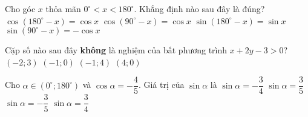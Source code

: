 \begin{ex}%
	Cho góc $x$ thỏa mãn $0^\circ < x < 180^\circ$. Khẳng định nào sau đây là đúng?
	\choice
	{$\cos \left(180^\circ - x \right) = \cos x$}
	{$\cos \left(90^\circ - x \right) = \cos x$}
	{\True $\sin \left(180^\circ - x \right) = \sin x$}
	{$\sin \left(90^\circ - x \right) = - \cos x$}
\end{ex}
\begin{ex}%
	Cặp số nào sau đây \textbf{không} là nghiệm của bất phương trình $x+2y-3>0$?
	\choice
	{$(-2;3)$}
	{\True $(-1;0)$}
	{$(-1;4)$}
	{$(4;0)$}
\end{ex}

\begin{ex}%
	Cho $\alpha \in\left(0^\circ; 180^\circ\right)$ và $\cos \alpha=-\dfrac{4}{5}$. Giá trị của $\sin \alpha$ là
	\choice
	{$\sin \alpha=-\dfrac{3}{4}$}
	{\True $\sin \alpha=\dfrac{3}{5}$}
	{$\sin \alpha=-\dfrac{3}{5}$}
	{$\sin \alpha=\dfrac{3}{4}$}
\end{ex}

